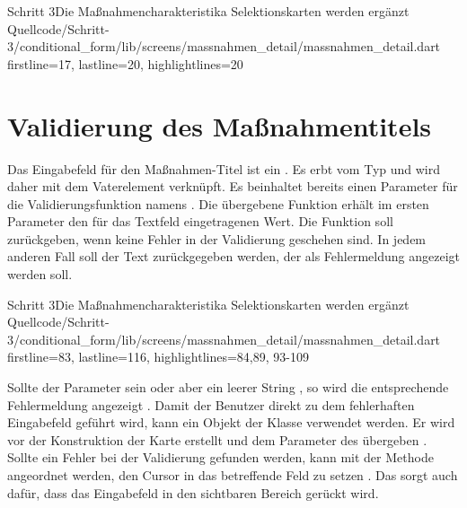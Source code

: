\begin{alexlisting}{Schritt 3}{Die Maßnahmencharakteristika Selektionskarten werden ergänzt}
    {Quellcode/Schritt-3/conditional_form/lib/screens/massnahmen_detail/massnahmen_detail.dart}
    {firstline=17, lastline=20, highlightlines={20}}
    \label{lst:Schritt3FormState}
\end{alexlisting}

\section{Validierung des Maßnahmentitels}

Das Eingabefeld für den Maßnahmen-Titel ist ein  .
Es erbt vom Typ  und wird daher mit dem Vaterelement  verknüpft.
Es beinhaltet bereits einen Parameter für die Validierungsfunktion namens  .
Die übergebene Funktion erhält im ersten Parameter den für das Textfeld eingetragenen Wert.
Die Funktion soll  zurückgeben, wenn keine Fehler in der Validierung geschehen sind.
In jedem anderen Fall soll der Text zurückgegeben werden, der als Fehlermeldung angezeigt werden soll.

\begin{alexlisting}{Schritt 3}{Die Maßnahmencharakteristika Selektionskarten werden ergänzt}
    {Quellcode/Schritt-3/conditional_form/lib/screens/massnahmen_detail/massnahmen_detail.dart}
    {firstline=83, lastline=116, highlightlines={84,89, 93-109}}
    \label{lst:Schritt3createMassnahmenTitelTextFormFieldValidator}
\end{alexlisting}

Sollte der Parameter  sein oder aber ein leerer String , so wird die entsprechende Fehlermeldung  angezeigt .
Damit der Benutzer direkt zu dem fehlerhaften Eingabefeld geführt wird, kann ein Objekt der Klasse  verwendet werden.
Er wird vor der Konstruktion der Karte erstellt  und dem Parameter  des  übergeben .
Sollte ein Fehler bei der Validierung gefunden werden, kann mit der Methode  angeordnet werden, den Cursor in das betreffende Feld zu setzen .
Das sorgt auch dafür, dass das Eingabefeld in den sichtbaren Bereich gerückt wird.

